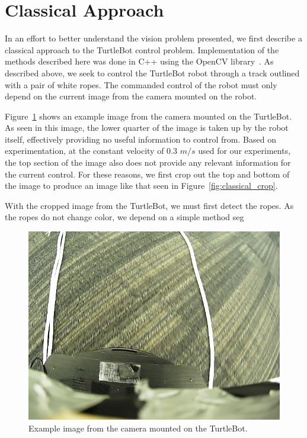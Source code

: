 \section{Classical Approach}
\label{sec:classical}

In an effort to better understand the vision problem presented, we first
describe a classical approach to the TurtleBot control problem. Implementation
of the methods described here was done in C++ using the OpenCV
library~\cite{opencv_library}. As described above, we seek to control the
TurtleBot robot through a track outlined with a pair of white ropes. The
commanded control of the robot must only depend on the current image from the
camera mounted on the robot.

Figure~\ref{fig:raw_img} shows an example image from the camera mounted on the
TurtleBot. As seen in this image, the lower quarter of the image is taken up by
the robot itself, effectively providing no useful information to control from.
Based on experimentation, at the constant velocity of 0.3 $m/s$ used for our
experiments, the top section of the image also does not provide any relevant
information for the current control. For these reasons, we first crop out the top
and bottom of the image to produce an image like that seen in 
Figure~\ref{fig:classical_crop}.

With the cropped image from the TurtleBot, we must first detect the ropes. As
the ropes do not change color, we depend on a simple method seg

\begin{figure}
  \centering
  \includegraphics[scale=0.5]{figures/raw_img.png}
  \caption{Example image from the camera mounted on the TurtleBot.}
  \label{fig:raw_img}
\end{figure}

